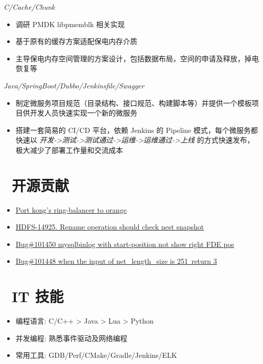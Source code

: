 \documentclass{resume}
\begin{document}
\textit{C/Cache/Chunk}
\begin{onehalfspacing}
\begin{itemize}
  \item 调研 PMDK libpmemblk 相关实现
  \item 基于原有的缓存方案适配保电内存介质
  \item 主导保电内存空间管理的方案设计，包括数据布局，空间的申请及释放，掉电恢复等
\end{itemize}
\end{onehalfspacing}

\textit{Java/SpringBoot/Dubbo/Jenkinsfile/Swagger}
\begin{onehalfspacing}
\begin{itemize}
  \item 制定微服务项目规范（目录结构、接口规范、构建脚本等）并提供一个模板项目供开发人员快速实现一个新的微服务
  \item 搭建一套简易的 CI/CD 平台，依赖 Jenkins 的 Pipeline 模式，每个微服务都快速以 \textit{开发->测试->测试通过->运维->运维通过->上线} 的方式快速发布，极大减少了部署工作量和交流成本
\end{itemize}
\end{onehalfspacing}

\section{\faCodeFork\ 开源贡献}
\begin{onehalfspacing}
  \begin{itemize}
    \item \href{https://github.com/orlabs/orange/pull/138}{Port kong's ring-balancer to orange}
    \item \href{https://github.com/apache/hadoop/pull/1670/files}{HDFS-14925. Rename operation should check nest snapshot}
    \item \href{https://github.com/mysql/mysql-server/pull/313}{Bug\#101450 mysqlbinlog with start-position not show right FDE pos}
    \item \href{https://github.com/mysql/mysql-server/pull/311}{Bug\#101448 when the input of net\_length\_size is 251\, return 3}
  \end{itemize}
  \end{onehalfspacing}

\section{\faWrench\ IT 技能}
\begin{itemize}[parsep=0.5ex]
  \item 编程语言: C/C++ > Java > Lua > Python
  \item 并发编程: 熟悉事件驱动及网络编程
  \item 常用工具: GDB/Perf/CMake/Gradle/Jenkins/ELK
\end{itemize}
\end{document}

